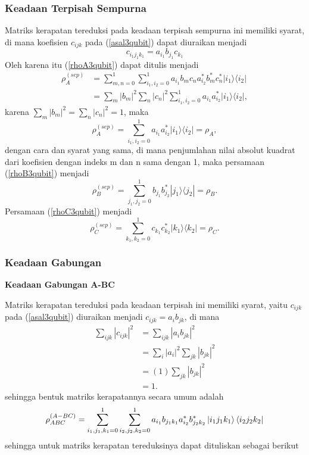 \subsubsection{Keadaan Terpisah Sempurna}
\par
Matriks kerapatan tereduksi pada keadaan terpisah sempurna ini memiliki syarat, di mana koefisien $c_{ijk}$ pada (\ref{asal3qubit}) dapat diuraikan menjadi
\begin{equation}
	c_{i_1j_1k_1}=a_{i_1}b_{j_1}c_{k_1}
\end{equation}
Oleh karena itu (\ref{rhoA3qubit}) dapat ditulis menjadi
\begin{align*}
	\rho_{A}^{(sep)}
	&= \sum_{m,n=0}^{1} \sum_{i_1,i_2=0}^{1}a_{i_1}b_m c_n a^{*}_{i_2}b^{*}_m c^{*}_n|i_1\rangle \langle i_2| \\
	&=\sum_{m}|b_m|^2\sum_{n}|c_n|^2\sum_{i_1,i_2=0}^{1}a_{i_1} a^{*}_{i_2}|i_1\rangle \langle i_2|,
\end{align*}
karena $\sum_{m}|b_m|^2=\sum_{n}|c_n|^2=1$, maka
\begin{equation}
	\rho_{A}^{(sep)} = \sum_{i_1,i_2=0}^{1}a_{i_1} a^{*}_{i_2}|i_1\rangle \langle i_2|=\rho_{A},
\end{equation}
dengan cara dan syarat yang sama, di mana penjumlahan nilai absolut kuadrat dari koefisien dengan indeks m dan n sama dengan 1, maka persamaan (\ref{rhoB3qubit}) menjadi
\begin{equation}
	\rho_{B}^{(sep)} = \sum_{j_1,j_2=0}^{1} b_{j_1}b^{*}_{j_2}|j_1\rangle \langle j_2|=\rho_{B}.
\end{equation}
Persamaan (\ref{rhoC3qubit}) menjadi
\begin{equation}
	\rho_{C}^{(sep)} = \sum_{k_1,k_2=0}^{1} c_{k_1}c^{*}_{k_2}|k_1\rangle \langle k_2|=\rho_{C}.
\end{equation}

\subsubsection{Keadaan Gabungan}

\textbf{Keadaan Gabungan A-BC}

Matriks kerapatan tereduksi pada keadaan terpisah ini memiliki syarat, yaitu $c_{ijk}$ pada (\ref{asal3qubit}) diuraikan menjadi $c_{ijk}=a_i b_{jk}$, di mana
\begin{align*}
	\sum_{ijk}|c_{ijk}|^2
	&=\sum_{i j k}|a_ib_{jk}|^2\\
	&=\sum_{i}|a_i|^2\sum_{jk}|b_{jk}|^2\\
	&=(1)\sum_{jk}|b_{jk}|^2\\
	&=1.
\end{align*}
sehingga bentuk matriks kerapatannya secara umum adalah
\begin{equation}
	\rho_{ABC}^{(A-BC)}=\sum_{i_1,j_1,k_1=0}^1\sum_{i_2,j_2,k_2=0}^1 a_{i_1}b_{j_1k_1} a^{*}_{i_2}b^{*}_{j_2k_2}\ket{i_1j_1k_1}\bra{i_2j_2k_2}
\end{equation}
sehingga untuk matriks kerapatan tereduksinya dapat dituliskan sebagai berikut

